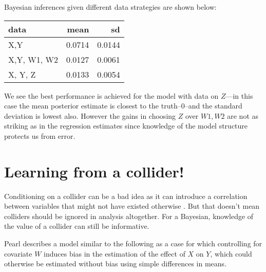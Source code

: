 \documentclass[
  12pt,
]{book}
\begin{document}
Bayesian inferences given different data strategies are shown below:

\begin{tabular}{l|r|r}
\hline
data & mean & sd\\
\hline
X,Y & 0.0714 & 0.0144\\
\hline
X,Y, W1, W2 & 0.0127 & 0.0061\\
\hline
X, Y, Z & 0.0133 & 0.0054\\
\hline
\end{tabular}

We see the best performance is achieved for the model with data on \(Z\)---in this case the mean posterior estimate is closest to the truth--0--and the standard deviation is lowest also. However the gains in choosing \(Z\) over \(W1, W2\) are not as striking as in the regression estimates since knowledge of the model structure protects us from error.

\hypertarget{learning-from-a-collider}{%
\section{Learning from a collider!}\label{learning-from-a-collider}}

Conditioning on a collider can be a bad idea as it can introduce a correlation between variables that might not have existed otherwise \citep{elwert2014endogenous}. But that doesn't mean colliders should be ignored in analysis altogether. For a Bayesian, knowledge of the value of a collider can still be informative.

Pearl describes a model similar to the following as a case for which controlling for covariate \(W\) induces bias in the estimation of the effect of \(X\) on \(Y\), which could otherwise be estimated without bias using simple differences in means.
\end{document}
